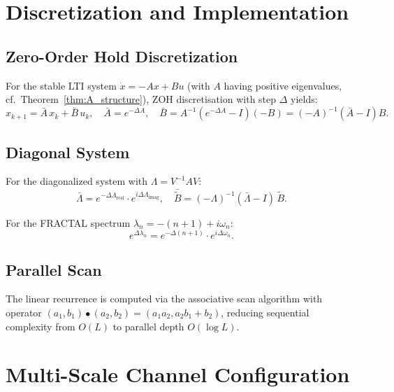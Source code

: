 \documentclass{article}
\theoremstyle{plain}
\theoremstyle{definition}
\theoremstyle{remark}
\begin{document}
\section{Discretization and Implementation}
\label{app:discretization}

\subsection{Zero-Order Hold Discretization}

For the stable LTI system $\dot{x} = -Ax + Bu$ (with $A$ having positive eigenvalues,
cf.\ Theorem~\ref{thm:A_structure}), ZOH discretisation with step $\Delta$ yields:
\begin{equation}
	x_{k+1} = \bar{A}\,x_k + \bar{B}\,u_k,
	\quad \bar{A} = e^{-\Delta A},
	\quad \bar{B} = A^{-1}(e^{-\Delta A} - I)(-B) = (-A)^{-1}(\bar{A}-I)B.
\end{equation}

\subsection{Diagonal System}

For the diagonalized system with $\Lambda = V^{-1} A V$:
\begin{equation}
	\bar{\Lambda} = e^{-\Delta \Lambda_{\mathrm{real}}}\cdot e^{i\Delta \Lambda_{\mathrm{imag}}},
	\quad
	\bar{\tilde{B}} = (-\Lambda)^{-1}(\bar{\Lambda} - I)\,\tilde{B}.
\end{equation}

For the FRACTAL spectrum $\lambda_n = -(n+1) + i\omega_n$:
\begin{equation}
	e^{\Delta \lambda_n} = e^{-\Delta(n+1)} \cdot e^{i\Delta\omega_n}.
\end{equation}

\subsection{Parallel Scan}

The linear recurrence is computed via the associative scan algorithm with operator $(a_1, b_1) \bullet (a_2, b_2) = (a_1 a_2, a_2 b_1 + b_2)$, reducing sequential complexity from $O(L)$ to parallel depth $O(\log L)$.

\section{Multi-Scale Channel Configuration}
\label{app:multiscale}
\end{document}
